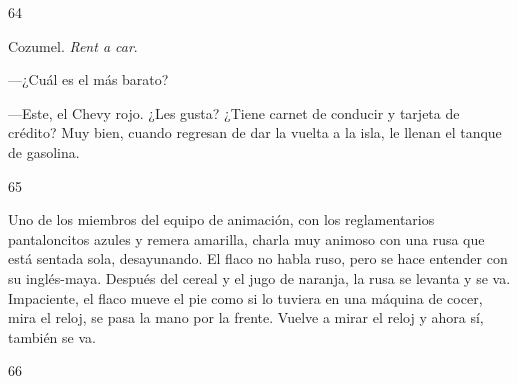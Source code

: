 \documentclass[12pt,twoside,openright,a5paper]{book}
\begin{document}
\vspace{0.5cm}

\hrulefill \hspace{0.1cm}\decofourleft\hspace{0.2cm} 64 \hspace{0.2cm}\decofourright \hspace{0.1cm}\hrulefill

\nopagebreak

\vspace{0.5cm}

\nopagebreak

Cozumel. \emph{Rent a car}.

---¿Cuál es el más barato?

---Este, el Chevy rojo. ¿Les gusta? ¿Tiene carnet de conducir y tarjeta de
crédito? Muy bien, cuando regresan de dar la vuelta a la isla, le llenan
el tanque de gasolina.

\vspace{0.5cm}

\hrulefill \hspace{0.1cm}\decofourleft\hspace{0.2cm} 65 \hspace{0.2cm}\decofourright \hspace{0.1cm}\hrulefill

\nopagebreak

\vspace{0.5cm}

\nopagebreak

Uno de los miembros del equipo de animación, con los reglamentarios
pantaloncitos azules y remera amarilla, charla muy animoso con una rusa que
está sentada sola, desayunando. El flaco no habla ruso, pero se hace
entender con su inglés-maya. Después del cereal y el jugo de naranja,
la rusa se levanta y se va. Impaciente, el flaco mueve el pie como si lo
tuviera en una máquina de cocer, mira el reloj, se pasa la mano por la
frente. Vuelve a mirar el reloj y ahora sí, también se va.

\vspace{0.5cm}

\hrulefill \hspace{0.1cm}\decofourleft\hspace{0.2cm} 66 \hspace{0.2cm}\decofourright \hspace{0.1cm}\hrulefill

\nopagebreak

\vspace{0.5cm}
\end{document}
